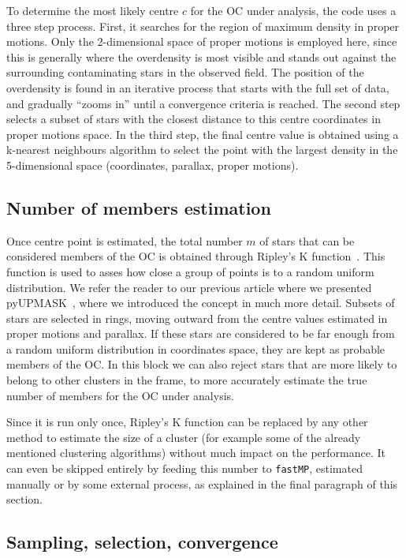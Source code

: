 \documentclass[fleqn,usenatbib]{mnras}
\begin{document}
To determine the most likely centre $c$ for the OC under analysis, the code uses a
three step process. First, it searches for the region of maximum density in
proper motions. Only the 2-dimensional space of proper motions is employed here,
since this is generally where the overdensity is most visible and stands out
against the surrounding contaminating stars in the observed field.
The position of the overdensity is found in an iterative process that starts
with the full set of data, and gradually ``zooms in'' until a convergence
criteria is reached.
The second step selects a subset of stars with the closest distance to this
centre coordinates in proper motions space. In the third step, the final centre
value is obtained using a k-nearest neighbours algorithm to select the point
with the largest density in the 5-dimensional space (coordinates, parallax,
proper motions).


\subsection{Number of members estimation}
\label{ssec:members_estim}

Once centre point is estimated, the total number $m$ of stars that can be
considered members of the OC is obtained through Ripley's K
function~\citep{ripley_1976,ripley_1979}. This function is used to asses how
close a group of points is to a random uniform distribution. We refer the
reader to our previous article where we presented pyUPMASK~\citep{Pera_2021},
where we introduced the concept in much more detail. Subsets of stars are
selected in rings, moving outward from the centre values estimated in proper
motions and parallax. If these stars are considered to be far enough from a
random uniform distribution in coordinates space, they are kept as probable
members of the OC. In this block we can also reject stars that are more
likely to belong to other clusters in the frame, to more accurately estimate the
true number of members for the OC under analysis.

Since it is run only once, Ripley's K function can be replaced by any other
method to estimate the size of a cluster (for example some of the already
mentioned clustering algorithms) without much impact on the performance. It can
even be skipped entirely by feeding this number to \texttt{fastMP}, estimated
manually or by some external process, as explained in the final paragraph of
this section.


\subsection{Sampling, selection, convergence}
\end{document}
